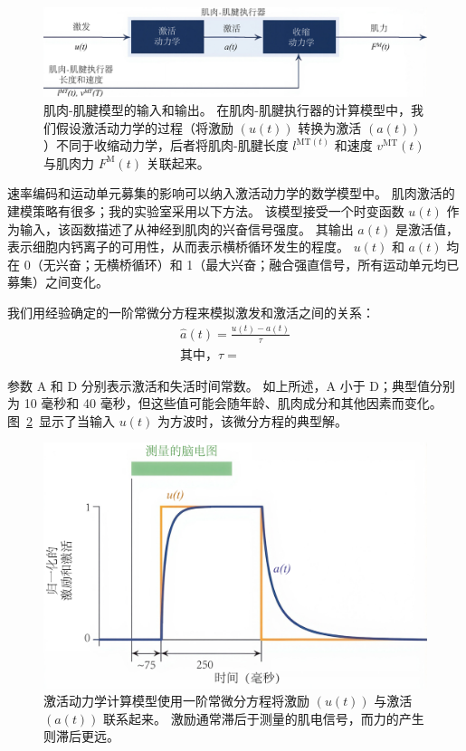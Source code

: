 \begin{figure}[!htb]
	\centering
	\includegraphics[width=1.0\linewidth]{chap4/4_15}
	\caption{肌肉-肌腱模型的输入和输出。
		在肌肉-肌腱执行器的计算模型中，我们假设激活动力学的过程（将激励 $(u(t))$  转换为激活 $(a(t))$）不同于收缩动力学，后者将肌肉-肌腱长度 $l^{\text{MT}(t)}$ 和速度 $v^{\text{MT}}(t)$ 与肌肉力 $F^{\text{M}}(t)$ 关联起来。 \label{fig:4_15}}
\end{figure}


速率编码和运动单元募集的影响可以纳入激活动力学的数学模型中。
肌肉激活的建模策略有很多；我的实验室采用以下方法。
该模型接受一个时变函数 $u(t)$ 作为输入，该函数描述了从神经到肌肉的兴奋信号强度。
其输出 $a(t)$ 是激活值，表示细胞内钙离子的可用性，从而表示横桥循环发生的程度。
$u(t)$ 和 $a(t)$ 均在 0（无兴奋；无横桥循环）和 1（最大兴奋；融合强直信号，所有运动单元均已募集）之间变化。


我们用经验确定的一阶常微分方程来模拟激发和激活之间的关系：
%
\begin{equation}
	\begin{aligned}
		\hat{a}(t) = \frac{u(t) - a(t)}{\tau} \\
		\text{其中，} \tau =
	\end{aligned}
\end{equation}


参数 A 和 D 分别表示激活和失活时间常数。
如上所述，A 小于 D；典型值分别为 10 毫秒和 40 毫秒，但这些值可能会随年龄、肌肉成分和其他因素而变化。
图~\ref{fig:4_16}~显示了当输入 $u(t)$ 为方波时，该微分方程的典型解。

\begin{figure}[!htb]
	\centering
	\includegraphics[width=1.0\linewidth]{chap4/4_16}
	\caption{激活动力学计算模型使用一阶常微分方程将激励 $(u(t))$ 与激活 $(a(t))$ 联系起来。
		激励通常滞后于测量的肌电信号，而力的产生则滞后更远。 \label{fig:4_16}}
\end{figure}


